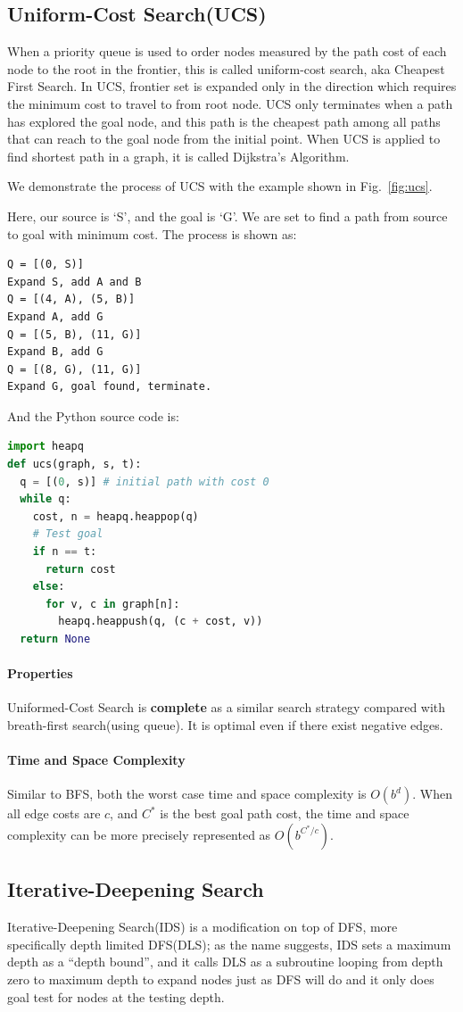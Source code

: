 \documentclass[main.tex]{subfiles}
\begin{document}
\subsection{Uniform-Cost Search(UCS)}
When a priority queue is used to order nodes measured by the path cost of each node to the root  in the frontier, this is called uniform-cost search, aka  Cheapest First Search. In UCS, frontier set is expanded only in the direction which requires the minimum cost to travel to from root node. UCS only terminates when a path has explored the goal node, and this path is the cheapest path among all paths that can reach to the goal node from the initial point.  When UCS is applied to find shortest path in a graph, it is called Dijkstra's Algorithm. 

We demonstrate the process of UCS with the example shown in Fig.~\ref{fig:ucs}.

Here, our source is `S', and the goal is `G'. We are set to find a path from source to goal with minimum cost. The process is shown as:
\begin{lstlisting}[numbers=none]
Q = [(0, S)]
Expand S, add A and B
Q = [(4, A), (5, B)]
Expand A, add G
Q = [(5, B), (11, G)]
Expand B, add G
Q = [(8, G), (11, G)]
Expand G, goal found, terminate.
\end{lstlisting}
And the Python source code is:
\begin{lstlisting}[language=Python]
import heapq
def ucs(graph, s, t):
  q = [(0, s)] # initial path with cost 0
  while q:
    cost, n = heapq.heappop(q)
    # Test goal
    if n == t:
      return cost
    else:
      for v, c in graph[n]:
        heapq.heappush(q, (c + cost, v))
  return None
\end{lstlisting}
\paragraph{Properties} Uniformed-Cost Search is \textbf{complete} as a similar search strategy compared with breath-first search(using queue). It is optimal even if there exist negative edges. 

\paragraph{Time and Space Complexity}  Similar to BFS, both the worst case time and space complexity is $O(b^d)$. When all edge costs are $c$, and $C^{*}$ is the best goal path cost, the time and space complexity can be more precisely represented as $O(b^{C^{*}/c})$.
\subsection{Iterative-Deepening Search}
Iterative-Deepening Search(IDS) is a modification on top of DFS, more specifically depth limited DFS(DLS); as the name suggests, IDS sets a maximum depth as a ``depth bound'', and it calls DLS as a subroutine looping from depth zero to maximum depth to expand nodes just as DFS will do and it only does goal test for nodes at the testing depth.
\end{document}
